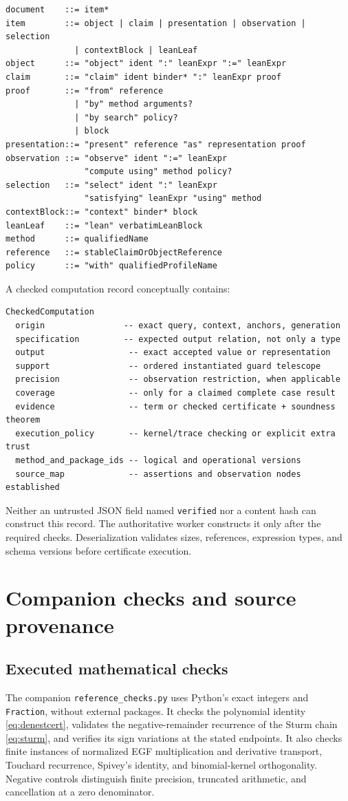 \documentclass[11pt,a4paper]{article}
\newcommand{\code}[1]{\nolinkurl{#1}}
\theoremstyle{definition}
\begin{document}
\begin{lstlisting}
document    ::= item*
item        ::= object | claim | presentation | observation | selection
              | contextBlock | leanLeaf
object      ::= "object" ident ":" leanExpr ":=" leanExpr
claim       ::= "claim" ident binder* ":" leanExpr proof
proof       ::= "from" reference
              | "by" method arguments?
              | "by search" policy?
              | block
presentation::= "present" reference "as" representation proof
observation ::= "observe" ident ":=" leanExpr
                "compute using" method policy?
selection   ::= "select" ident ":" leanExpr
                "satisfying" leanExpr "using" method
contextBlock::= "context" binder* block
leanLeaf    ::= "lean" verbatimLeanBlock
method      ::= qualifiedName
reference   ::= stableClaimOrObjectReference
policy      ::= "with" qualifiedProfileName
\end{lstlisting}

A checked computation record conceptually contains:
\begin{lstlisting}
CheckedComputation
  origin                -- exact query, context, anchors, generation
  specification         -- expected output relation, not only a type
  output                 -- exact accepted value or representation
  support                -- ordered instantiated guard telescope
  precision              -- observation restriction, when applicable
  coverage               -- only for a claimed complete case result
  evidence               -- term or checked certificate + soundness theorem
  execution_policy       -- kernel/trace checking or explicit extra trust
  method_and_package_ids -- logical and operational versions
  source_map             -- assertions and observation nodes established
\end{lstlisting}

Neither an untrusted JSON field named \code{verified} nor a content hash can
construct this record. The authoritative worker constructs it only after the
required checks. Deserialization validates sizes, references, expression types,
and schema versions before certificate execution.

\clearpage
\section{Companion checks and source provenance}\label{app:checks}
\subsection{Executed mathematical checks}
The companion \code{reference_checks.py} uses Python's exact integers and
\code{Fraction}, without external packages. It checks the polynomial identity
\eqref{eq:denestcert}, validates the negative-remainder recurrence of the Sturm
chain \eqref{eq:sturm}, and verifies its sign variations at the stated endpoints.
It also checks finite instances of normalized EGF multiplication and derivative
transport, Touchard recurrence, Spivey's identity, and binomial-kernel
orthogonality. Negative controls distinguish finite precision, truncated
arithmetic, and cancellation at a zero denominator.
\end{document}
